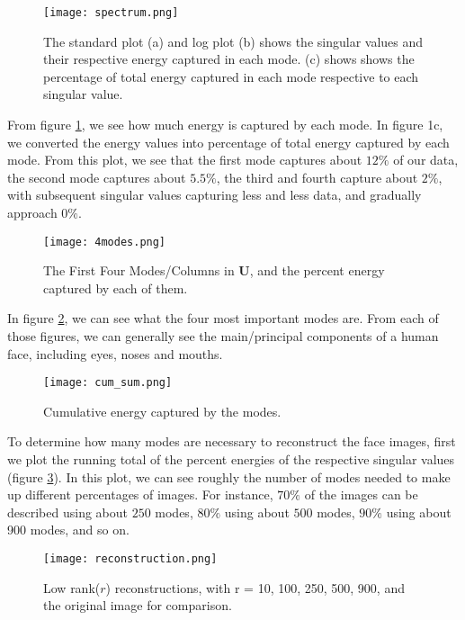 \documentclass[12pt,a4paper]{article}
\begin{document}
\begin{figure}[H]
\texttt{[image: spectrum.png]}
\caption{The standard plot (a) and log plot (b) shows the singular values and their respective energy captured in each mode. (c) shows shows the percentage of total energy captured in each mode respective to each singular value.}
\label{fig:spectrum}
\end{figure}
From figure \ref{fig:spectrum}, we see how much energy is captured by each mode. In figure 1c, we converted the energy values into percentage of total energy captured by each mode. From this plot, we see that the first mode captures about $12\%$ of our data, the second mode captures about $5.5\%$, the third and fourth capture about $2\%$, with subsequent singular values capturing less and less data, and gradually approach $0\%$. \\

\begin{figure}[H]
\centering
\texttt{[image: 4modes.png]}
\caption{The First Four Modes/Columns in $\mathbf{U}$, and the percent energy captured by each of them.}
\label{fig:firsts}
\end{figure}

In figure \ref{fig:firsts}, we can see what the four most important modes are. From each of those figures, we can generally see the main/principal components of a human face, including eyes, noses and mouths. \\

\begin{figure}[H]
\centering
\texttt{[image: cum\_sum.png]}
\caption{Cumulative energy captured by the modes.}
\label{fig:cum}
\end{figure}

To determine how many modes are necessary to reconstruct the face images, first we plot the running total of the percent energies of the respective singular values (figure \ref{fig:cum}). In this plot, we can see roughly the number of modes needed to make up different percentages of images. For instance, $70\%$ of the images can be described using about $250$ modes, $80\%$ using about $500$ modes, $90\%$ using about 900 modes, and so on. \\

\begin{figure}[H]
\texttt{[image: reconstruction.png]}
\caption{Low rank($r$) reconstructions, with r = 10, 100, 250, 500, 900, and the original image for comparison.}
\label{fig:recon}
\end{figure}
\end{document}
